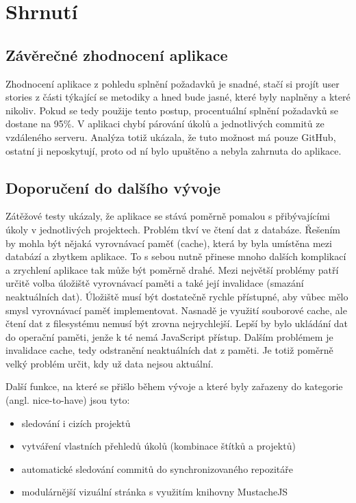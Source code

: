 \chapter{Shrnutí}

\section{Závěrečné zhodnocení aplikace}

Zhodnocení aplikace z pohledu splnění požadavků je snadné, stačí si projít user stories z části týkající se metodiky a hned bude jasné, které byly naplněny a které nikoliv. Pokud se tedy použije tento postup, procentuální splnění požadavků se dostane na 95\%. V aplikaci chybí párování úkolů a jednotlivých commitů ze vzdáleného serveru. Analýza totiž ukázala, že tuto možnost má pouze GitHub, ostatní ji neposkytují, proto od ní bylo upuštěno a nebyla zahrnuta do aplikace.

\section{Doporučení do dalšího vývoje}

Zátěžové testy ukázaly, že aplikace se stává poměrně pomalou s přibývajícími úkoly v jednotlivých projektech. Problém tkví ve čtení dat z databáze. Řešením by mohla být nějaká vyrovnávací paměť (cache), která by byla umístěna mezi databází a zbytkem aplikace. To s sebou nutně přinese mnoho dalších komplikací a zrychlení aplikace tak může být poměrně drahé. Mezi největší problémy patří určitě volba úložiště vyrovnávací paměti a také její invalidace (smazání neaktuálních dat). Úložiště musí být dostatečně rychle přístupné, aby vůbec mělo smysl vyrovnávací paměť implementovat. Nasnadě je využití souborové cache, ale čtení dat z filesystému nemusí být zrovna nejrychlejší. Lepší by bylo ukládání dat do operační paměti, jenže k té nemá JavaScript přístup. Dalším problémem je invalidace cache, tedy odstranění neaktuálních dat z paměti. Je totiž poměrně velký problém určit, kdy už data nejsou aktuální.

Další funkce, na které se přišlo během vývoje a které byly zařazeny do kategorie  (angl. nice-to-have) jsou tyto:

\begin{itemize}
\item sledování i cizích projektů
\item vytváření vlastních přehledů úkolů (kombinace štítků a projektů)
\item automatické sledování commitů do synchronizovaného repozitáře
\item modulárnější vizuální stránka s využitím knihovny MustacheJS\cite{mustache}
\end{itemize}

